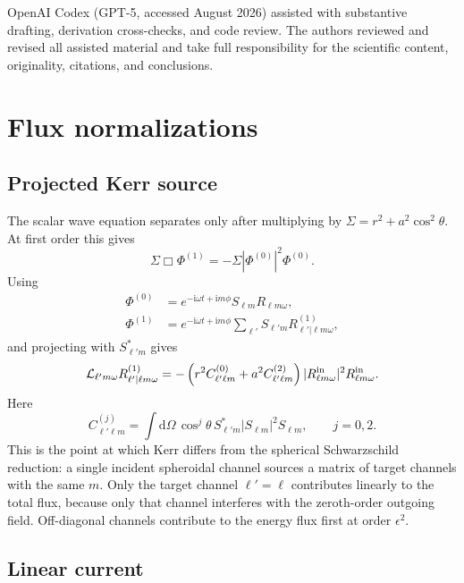 \documentclass[aps,prd,twocolumn,10pt,nofootinbib,superscriptaddress,floatfix]{revtex4-2}
\newcommand{\dd}{\mathrm{d}}
\newcommand{\ii}{\mathrm{i}}
\begin{document}
OpenAI Codex (GPT-5, accessed August 2026) assisted with substantive drafting,
derivation cross-checks, and code review.  The authors reviewed and revised all
assisted material and take full responsibility for the scientific content,
originality, citations, and conclusions.

\appendix

\section{Flux normalizations}
\label{app:flux}

\subsection{Projected Kerr source}

The scalar wave equation separates only after multiplying by
$\Sigma=r^2+a^2\cos^2\theta$.  At first order this gives
\begin{equation}
\Sigma\Box\Phi^{(1)}=-\Sigma|\Phi^{(0)}|^2\Phi^{(0)} .
\end{equation}
Using
\begin{align}
\Phi^{(0)}
&=e^{-\ii\omega t+\ii m\phi}S_{\ell m}R_{\ell m\omega},
\nonumber\\
\Phi^{(1)}
&=e^{-\ii\omega t+\ii m\phi}
\sum_{\ell'}S_{\ell'm}R^{(1)}_{\ell'|\ell m\omega},
\end{align}
and projecting with $S_{\ell'm}^*$ gives
\begin{equation}
\mathcal L_{\ell'm\omega}R^{(1)}_{\ell'|\ell m\omega}
=-\left(r^2C^{(0)}_{\ell'\ell m}
+a^2C^{(2)}_{\ell'\ell m}\right)
|R_{\ell m\omega}^{\rm in}|^2R_{\ell m\omega}^{\rm in}.
\end{equation}
Here
\begin{equation}
C^{(j)}_{\ell'\ell m}=
\int \dd\Omega\,\cos^j\theta\,
S_{\ell'm}^*|S_{\ell m}|^2S_{\ell m},
\qquad j=0,2 .
\end{equation}
This is the point at which Kerr differs from the spherical Schwarzschild
reduction: a single incident spheroidal channel sources a matrix of target
channels with the same $m$.  Only the target channel $\ell'=\ell$ contributes
linearly to the total flux, because only that channel interferes with the
zeroth-order outgoing field.  Off-diagonal channels contribute to the energy
flux first at order $\epsilon^2$.

\subsection{Linear current}
\end{document}
